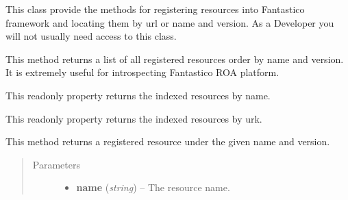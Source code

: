 \documentclass[letterpaper,10pt,english]{sphinxmanual}
\begin{document}
\begin{fulllineitems}
\label{features/roa/technical_summary:fantastico.roa.resources_registry.ResourcesRegistry}
This class provide the methods for registering resources into Fantastico framework and locating them by url or name and
version. As a Developer you will not usually need access to this class.

\begin{fulllineitems}
\label{features/roa/technical_summary:fantastico.roa.resources_registry.ResourcesRegistry.all_resources}
This method returns a list of all registered resources order by name and version. It is extremely useful for
introspecting Fantastico ROA platform.

\end{fulllineitems}


\begin{fulllineitems}
\label{features/roa/technical_summary:fantastico.roa.resources_registry.ResourcesRegistry.available_resources}
This readonly property returns the indexed resources by name.

\end{fulllineitems}


\begin{fulllineitems}
\label{features/roa/technical_summary:fantastico.roa.resources_registry.ResourcesRegistry.available_url_resources}
This readonly property returns the indexed resources by urk.

\end{fulllineitems}


\begin{fulllineitems}
\label{features/roa/technical_summary:fantastico.roa.resources_registry.ResourcesRegistry.find_by_name}
This method returns a registered resource under the given name and version.
\begin{quote}\begin{description}
\item[{Parameters}] \leavevmode\begin{itemize}
\item {} 
\textbf{name} (\emph{string}) -- The resource name.


\end{itemize}
\end{description}
\end{quote}
\end{fulllineitems}
\end{fulllineitems}
\end{document}

